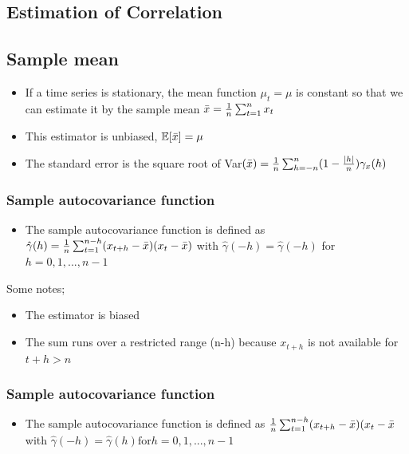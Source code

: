 \documentclass{article}
\begin{document}
\subsection{Estimation of Correlation}

\subsection{Sample mean}
\begin{itemize}
    \item If a time series is stationary, the mean function $\mu_t = \mu$ is constant so that we can estimate it by the sample mean 
    \subitem $\Bar{x} = \frac{1}{n}\sum_{t=1}^n x_t$
    \item This estimator is unbiased, 
    \subitem $\mathbb{E}[\Bar{x}] = \mu$
    \item The standard error is the square root of
    \subitem Var$(\Bar{x}) = \frac{1}{n} \sum_{h = -n}^n (1 - \frac{|h|}{n}) \gamma_x (h)$
\end{itemize}


\subsubsection{Sample autocovariance function}
\begin{itemize}
    \item The sample autocovariance function is defined as
    \subitem $\hat{\gamma}(h) = \frac{1}{n} \sum_{t=1}^{n-h} (x_{t+h} - \Bar{x}) (x_t - \Bar{x})$ \hspace{1cm} with $\hat{\gamma}(-h) = \hat{\gamma}(-h)$ for $h = 0,1,..., n-1$
\end{itemize}
\noindent Some notes;
\begin{itemize}
    \item The estimator is biased
    \item The sum runs over a restricted range (n-h) because $x_{t+h}$ is not available for $t + h > n$
\end{itemize}


\subsubsection{Sample autocovariance function}

\begin{itemize}
    \item The sample autocovariance function is defined as 
    \subitem $\frac{1}{n}\sum_{t=1}^{n-h} (x_{t+h} - \Bar{x}) (x_t - \Bar{x}$ \hspace{1cm} with $\hat{\gamma}(-h) = \hat{\gamma}(h) \text{for} h = 0,1, ..., n-1$
\end{itemize}
\end{document}
